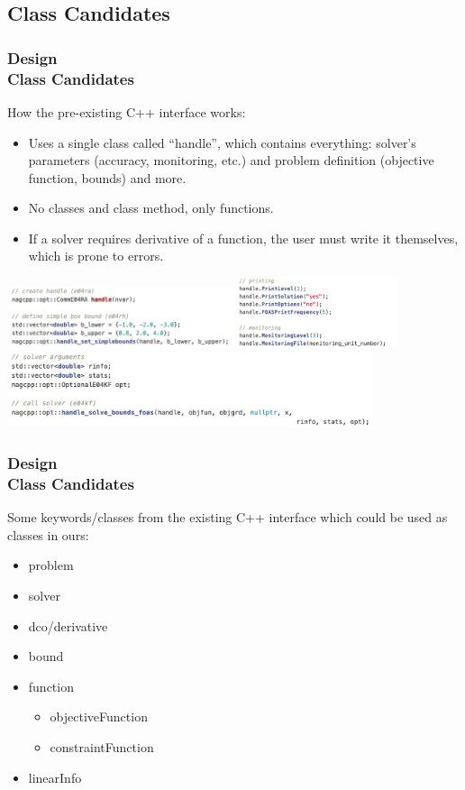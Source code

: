 \documentclass[ucs,10pt]{beamer}
\begin{document}
\subsection{Class Candidates}
\begin{frame}
\frametitle{Design \\
\small \color{rwth-blue} Class Candidates}
\small How the pre-existing C++ interface works:
\small\begin{itemize}
	\item Uses a single class called “handle”, which contains everything: solver’s parameters (accuracy, monitoring, etc.) and problem definition (objective function, bounds) and more.
	\item No classes and class method, only functions.
	\item If a solver requires derivative of a function, the user must write it themselves, which is prone to errors.
\end{itemize}
\includegraphics[width=0.5\textwidth]{preinterface1.png}
\includegraphics[width=0.35\textwidth]{preinterface2.png}
\includegraphics[width=0.8\textwidth]{preinterface3.png}
\end{frame}

\begin{frame}
\frametitle{Design \\
\small \color{rwth-blue} Class Candidates}
Some keywords/classes from the existing C++ interface which could be used as classes in ours:
\begin{itemize}
	\item problem
	\item solver
	\item dco/derivative
	\item bound
	\item function
		\begin{itemize}
			\item objectiveFunction
			\item constraintFunction
		\end{itemize}
	\item linearInfo
\end{itemize}
\end{frame}
\end{document}
